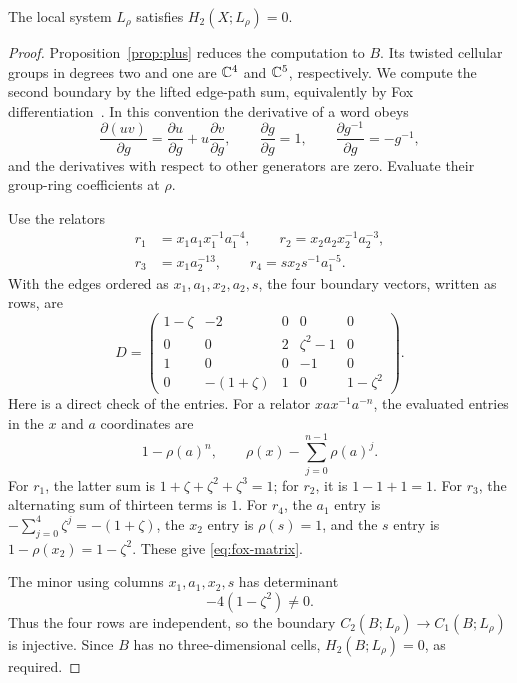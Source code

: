 \begin{lemma}\label{lem:twisted-vanishing}
The local system $L_\rho$ satisfies $H_2(X;L_\rho)=0$.
\end{lemma}

\begin{proof}
Proposition~\ref{prop:plus} reduces the computation to $B$.
Its twisted cellular groups in degrees two and one are $\mathbb C^4$ and
$\mathbb C^5$, respectively. We compute the second boundary by the lifted
edge-path sum, equivalently by Fox differentiation~\cite{Fox53}.
In this convention the derivative of a word obeys
\[
 \frac{\partial(uv)}{\partial g}
   =\frac{\partial u}{\partial g}
      +u\frac{\partial v}{\partial g},\qquad
 \frac{\partial g}{\partial g}=1,\qquad
 \frac{\partial g^{-1}}{\partial g}=-g^{-1},
\]
and the derivatives with respect to other generators are zero.
Evaluate their group-ring coefficients at $\rho$.

Use the relators
\[
 \begin{split}
 r_1&=x_1a_1x_1^{-1}a_1^{-4},\qquad
 r_2=x_2a_2x_2^{-1}a_2^{-3},\\
 r_3&=x_1a_2^{-13},\qquad
 r_4=sx_2s^{-1}a_1^{-5}.
 \end{split}
\]
With the edges ordered as $x_1,a_1,x_2,a_2,s$, the four boundary
vectors, written as rows, are
\begin{equation}\label{eq:fox-matrix}
 D=\begin{pmatrix}
 1-\zeta & -2 & 0 & 0 & 0\\
 0&0&2&\zeta^2-1&0\\
 1&0&0&-1&0\\
 0&-(1+\zeta)&1&0&1-\zeta^2
 \end{pmatrix}.
\end{equation}
Here is a direct check of the entries. For a relator
$xax^{-1}a^{-n}$, the evaluated entries in the $x$ and $a$
coordinates are
\[
 1-\rho(a)^n,
 \qquad \rho(x)-\sum_{j=0}^{n-1}\rho(a)^j.
\]
For $r_1$, the latter sum is
$1+\zeta+\zeta^2+\zeta^3=1$; for $r_2$, it is $1-1+1=1$.
For $r_3$, the alternating sum of thirteen terms is $1$.
For $r_4$, the $a_1$ entry is
$-\sum_{j=0}^4\zeta^j=-(1+\zeta)$, the $x_2$ entry is
$\rho(s)=1$, and the $s$ entry is $1-\rho(x_2)=1-\zeta^2$.
These give \eqref{eq:fox-matrix}.

The minor using columns $x_1,a_1,x_2,s$ has determinant
\begin{equation}\label{eq:nonzero-minor}
 -4(1-\zeta^2)\ne0.
\end{equation}
Thus the four rows are independent, so the boundary
$C_2(B;L_\rho)\to C_1(B;L_\rho)$ is injective.
Since $B$ has no three-dimensional cells, $H_2(B;L_\rho)=0$,
as required.
\end{proof}

